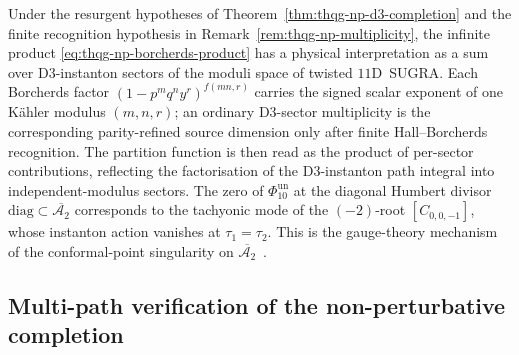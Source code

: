 \begin{remark}
\label{rem:thqg-np-moduli-interpretation}
Under the resurgent hypotheses of
Theorem~\ref{thm:thqg-np-d3-completion} and the finite recognition
hypothesis in Remark~\ref{rem:thqg-np-multiplicity}, the infinite
product \eqref{eq:thqg-np-borcherds-product} has a physical
interpretation as a sum over D$3$-instanton sectors of the moduli space
of twisted $11$D~SUGRA. Each Borcherds factor
$(1 - p^m q^n y^r)^{f(mn,r)}$ carries the signed scalar exponent of
one K\"ahler modulus $(m,n,r)$; an ordinary D$3$-sector multiplicity is
the corresponding parity-refined source dimension only after
finite Hall--Borcherds recognition. The partition function is then read
as the product of per-sector contributions, reflecting the factorisation
of the D$3$-instanton path integral into
independent-modulus sectors. The zero of $\Phi_{10}^{\mathrm{un}}$ at the diagonal
Humbert divisor $\mathrm{diag}\subset\overline{\mathcal{A}_2}$
corresponds to the tachyonic mode of the $(-2)$-root
$[C_{0, 0, -1}]$, whose instanton action vanishes at
$\tau_1 = \tau_2$. This is the gauge-theory mechanism of the
conformal-point singularity on
$\overline{\mathcal{A}_2}$~\cite[\S 4]{GritsenkoNikulin1997}.
\end{remark}

\subsection{Multi-path verification of the non-perturbative completion}
\label{subsec:thqg-np-multipath}

